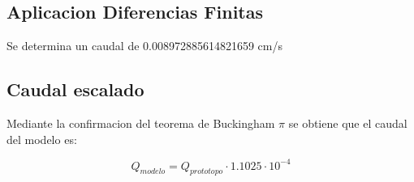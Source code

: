 \subsection{Aplicacion Diferencias Finitas}

Se determina un caudal de 0.008972885614821659 cm/s

\subsection{Caudal escalado}

Mediante la confirmacion del teorema de Buckingham $\pi$ se obtiene que el caudal del modelo es:

\begin{equation}
    Q_{modelo} = Q_{prototopo} \cdot 1.1025 \cdot 10^{-4}
\end{equation}
